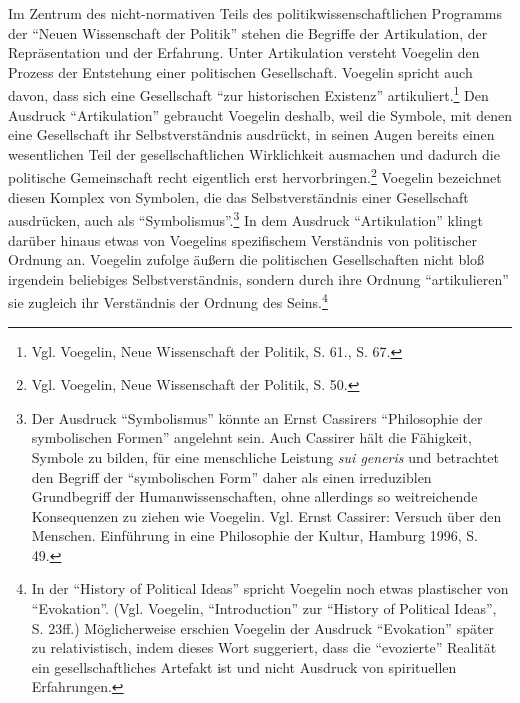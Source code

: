 Im Zentrum des nicht-normativen Teils des politikwissenschaftlichen
Programms der "`Neuen Wissenschaft der Politik"' stehen die Begriffe
der Artikulation, der Repräsentation und der Erfahrung. Unter
Artikulation versteht Voegelin den Prozess der Entstehung einer
politischen Gesellschaft. Voegelin spricht auch davon, dass sich eine
Gesellschaft "`zur historischen Existenz"' artikuliert.\footnote{Vgl.
  Voegelin, Neue Wissenschaft der Politik, S. 61., S. 67.} Den Ausdruck
"`Artikulation"' gebraucht Voegelin deshalb, weil die Symbole, mit denen
eine Gesellschaft ihr Selbstverständnis ausdrückt, in seinen Augen
bereits einen wesentlichen Teil der gesellschaftlichen Wirklichkeit
ausmachen und dadurch die politische Gemeinschaft recht eigentlich erst
hervorbringen.\footnote{Vgl. Voegelin, Neue Wissenschaft der Politik,
  S. 50.}  Voegelin bezeichnet diesen Komplex von Symbolen, die das
Selbstverständnis einer Gesellschaft ausdrücken, auch als
"`Symbolismus"'.\footnote{Der Ausdruck "`Symbolismus"' könnte an Ernst
  Cassirers "`Philosophie der symbolischen Formen"' angelehnt sein. Auch
  Cassirer hält die Fähigkeit, Symbole zu bilden, für eine menschliche
  Leistung {\it sui generis} und betrachtet den Begriff der
  "`symbolischen Form"' daher als einen irreduziblen Grundbegriff der
  Humanwissenschaften, ohne allerdings so weitreichende Konsequenzen zu
  ziehen wie Voegelin.  Vgl. Ernst Cassirer: Versuch über den Menschen.
  Einführung in eine Philosophie der Kultur, Hamburg 1996, S. 49.} In dem
Ausdruck "`Artikulation"' klingt darüber hinaus etwas von Voegelins
spezifischem Verständnis von politischer Ordnung an. Voegelin zufolge
äußern die politischen Gesellschaften nicht bloß irgendein beliebiges
Selbstverständnis, sondern durch ihre Ordnung "`artikulieren"' sie
zugleich ihr Verständnis der Ordnung des Seins.\footnote{In der
  "`History of Political Ideas"' spricht Voegelin noch etwas plastischer
  von "`Evokation"'.  (Vgl.  Voegelin, "`Introduction"' zur "`History of
  Political Ideas"', S. 23ff.)  Möglicherweise erschien Voegelin der
  Ausdruck "`Evokation"' später zu relativistisch, indem dieses Wort
  suggeriert, dass die "`evozierte"' Realität ein gesellschaftliches
  Artefakt ist und nicht Ausdruck von spirituellen Erfahrungen.}

